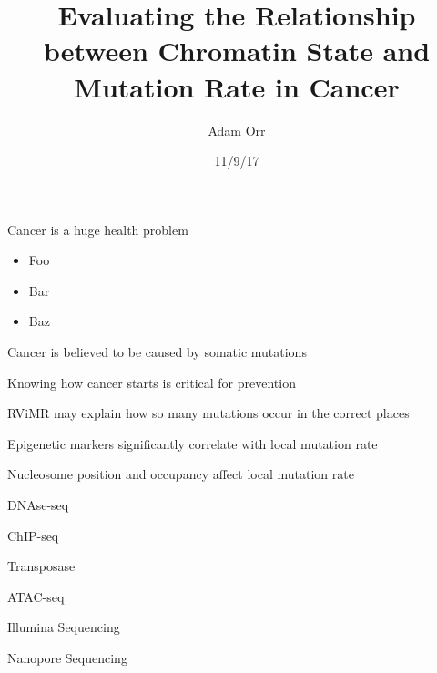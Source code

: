 \documentclass{beamer}
\title[Chromatin and Mutation]{Evaluating the Relationship between Chromatin State and Mutation Rate in Cancer}
\date{11/9/17}
\author{Adam Orr}
\begin{document}
\frame{\titlepage}

\begin{frame}{Cancer is a huge health problem}
\begin{itemize}
\item Foo
\item Bar
\item Baz
\end{itemize}
\end{frame}

\begin{frame}{Cancer is believed to be caused by somatic mutations}
\end{frame}

\begin{frame}{Knowing how cancer starts is critical for prevention}
\end{frame}

\begin{frame}{RViMR may explain how so many mutations occur in the correct places}
\end{frame}

\begin{frame}{Epigenetic markers significantly correlate with local mutation rate}
\end{frame}

\begin{frame}{Nucleosome position and occupancy affect local mutation rate}
\end{frame}


\begin{frame}{DNAse-seq}
\end{frame}

\begin{frame}{ChIP-seq}
\end{frame}

\begin{frame}{Transposase}
\end{frame}

\begin{frame}{ATAC-seq}
\end{frame}


\begin{frame}{Illumina Sequencing}
\end{frame}

\begin{frame}{Nanopore Sequencing}
\end{frame}
\end{document}
